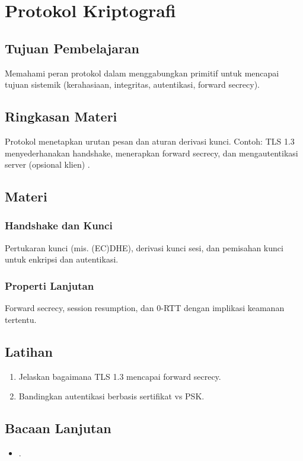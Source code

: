 \documentclass[../main.tex]{subfiles}
\begin{document}
\chapter{Protokol Kriptografi}
\section{Tujuan Pembelajaran}
Memahami peran protokol dalam menggabungkan primitif untuk mencapai tujuan sistemik (kerahasiaan, integritas, autentikasi, forward secrecy).

\section{Ringkasan Materi}
Protokol menetapkan urutan pesan dan aturan derivasi kunci. Contoh: TLS 1.3 menyederhanakan handshake, menerapkan forward secrecy, dan mengautentikasi server (opsional klien) \citep{rfc8446}.

\section{Materi}
\subsection{Handshake dan Kunci}
Pertukaran kunci (mis. (EC)DHE), derivasi kunci sesi, dan pemisahan kunci untuk enkripsi dan autentikasi.

\subsection{Properti Lanjutan}
Forward secrecy, session resumption, dan 0-RTT dengan implikasi keamanan tertentu.

\section{Latihan}
\begin{enumerate}
  \item Jelaskan bagaimana TLS 1.3 mencapai forward secrecy.
  \item Bandingkan autentikasi berbasis sertifikat vs PSK.
\end{enumerate}

\section{Bacaan Lanjutan}
\begin{itemize}
  \item \citep{rfc8446}.
\end{itemize}
\end{document}
